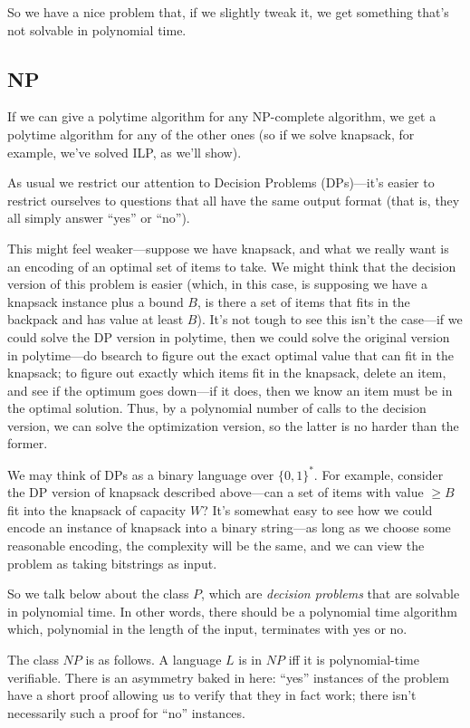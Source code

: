 \documentclass{article}
\begin{document}
So we have a nice problem that, if we slightly tweak it, we get something
that's not solvable in polynomial time.


\subsection{NP}

If we can give a polytime algorithm for any NP-complete algorithm, we get
a polytime algorithm for any of the other ones (so if we solve knapsack,
for example, we've solved ILP, as we'll show).

As usual we restrict our attention to Decision Problems (DPs)---it's easier
to restrict ourselves to questions that all have the same output
format (that is, they all simply answer ``yes'' or ``no'').

This might feel weaker---suppose we have knapsack, and what we really want
is an encoding of an optimal set of items to take. We might think that
the decision version of this problem is easier (which, in this case, is
supposing we have a knapsack instance plus a bound $B$, is there a set of
items that fits in the backpack and has value at least $B$). It's not
tough to see this isn't the case---if we could solve the DP version in 
polytime, then we could solve the original version in polytime---do bsearch
to figure out the exact optimal value that can fit in the knapsack; to figure
out exactly which items fit in the knapsack, delete an item, and see if the
optimum goes down---if it does, then we know an item must be in the optimal
solution.
Thus, by a polynomial number of calls to the decision version, we can solve
the optimization version, so the latter is no harder than the former.

We may think of DPs as a binary language over $\{0,1\}^*$. For example, 
consider the DP version of knapsack described above---can a set of items with
value $\geq B$ fit into the knapsack of capacity $W$?
It's somewhat easy to see how we could encode an instance of knapsack into
a binary string---as long as we choose some reasonable encoding, the complexity
will be the same, and we can view the problem as taking bitstrings as input.

So we talk below about the class $P$, which are \emph{decision problems} that 
are solvable in polynomial time.
In other words, there should be a polynomial time algorithm which,
polynomial in the length of the input, terminates with yes or no.

The class $NP$ is as follows. A language $L$ is in $NP$ iff it is
polynomial-time verifiable. There is an asymmetry baked in here: ``yes''
instances of the problem have a short proof allowing us to verify that they
in fact work; there isn't necessarily such a proof for ``no'' instances.
\end{document}
